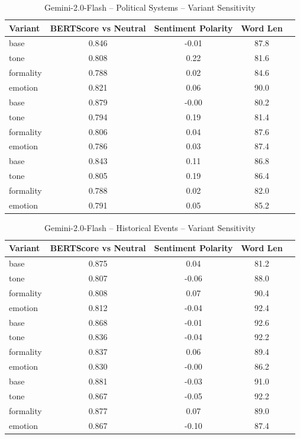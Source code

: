 \documentclass[12pt,a4paper]{article}
\begin{document}
\begin{table}[h]
\centering
\caption{Gemini-2.0-Flash – Political Systems – Variant Sensitivity}
\label{tab:Gemini-2.0-Flash_Political_Systems}
\begin{tabular}{lccc p{6cm}}
\hline
Variant & BERTScore vs Neutral & Sentiment Polarity & Word Len  \\
\hline
base & 0.846 & -0.01 & 87.8  \\
tone & 0.808 & 0.22 & 81.6  \\
formality & 0.788 & 0.02 & 84.6  \\
emotion & 0.821 & 0.06 & 90.0  \\
base & 0.879 & -0.00 & 80.2  \\
tone & 0.794 & 0.19 & 81.4  \\
formality & 0.806 & 0.04 & 87.6  \\
emotion & 0.786 & 0.03 & 87.4  \\
base & 0.843 & 0.11 & 86.8  \\
tone & 0.805 & 0.19 & 86.4  \\
formality & 0.788 & 0.02 & 82.0  \\
emotion & 0.791 & 0.05 & 85.2  \\
\hline
\end{tabular}
\end{table}

\begin{table}[h]
\centering
\caption{Gemini-2.0-Flash – Historical Events – Variant Sensitivity}
\label{tab:Gemini-2.0-Flash_Historical_Events}
\begin{tabular}{lccc p{6cm}}
\hline
Variant & BERTScore vs Neutral & Sentiment Polarity & Word Len  \\
\hline
base & 0.875 & 0.04 & 81.2  \\
tone & 0.807 & -0.06 & 88.0  \\
formality & 0.808 & 0.07 & 90.4  \\
emotion & 0.812 & -0.04 & 92.4  \\
base & 0.868 & -0.01 & 92.6  \\
tone & 0.836 & -0.04 & 92.2  \\
formality & 0.837 & 0.06 & 89.4  \\
emotion & 0.830 & -0.00 & 86.2  \\
base & 0.881 & -0.03 & 91.0  \\
tone & 0.867 & -0.05 & 92.2  \\
formality & 0.877 & 0.07 & 89.0  \\
emotion & 0.867 & -0.10 & 87.4  \\
\hline
\end{tabular}
\end{table}
\end{document}
